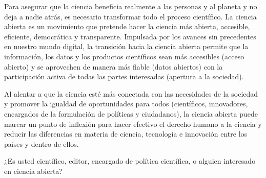 \documentclass[
  letterpaper,
  DIV=11,
  numbers=noendperiod]{scrartcl}
\theoremstyle{definition}
\theoremstyle{remark}
\begin{document}
\begin{tcolorbox}[enhanced jigsaw, left=2mm, title=\textcolor{quarto-callout-warning-color}{\faExclamationTriangle}\hspace{0.5em}{Advertencia}, colbacktitle=quarto-callout-warning-color!10!white, opacitybacktitle=0.6, opacityback=0, colframe=quarto-callout-warning-color-frame, colback=white, rightrule=.15mm, toprule=.15mm, bottomrule=.15mm, bottomtitle=1mm, coltitle=black, breakable, toptitle=1mm, titlerule=0mm, arc=.35mm, leftrule=.75mm]

Para asegurar que la ciencia beneficia realmente a las personas y al
planeta y no deja a nadie atrás, es necesario transformar todo el
proceso científico. La ciencia abierta es un movimiento que pretende
hacer la ciencia más abierta, accesible, eficiente, democrática y
transparente. Impulsada por los avances sin precedentes en nuestro mundo
digital, la transición hacia la ciencia abierta permite que la
información, los datos y los productos científicos sean más accesibles
(acceso abierto) y se aprovechen de manera más fiable (datos abiertos)
con la participación activa de todas las partes interesadas (apertura a
la sociedad).

\end{tcolorbox}

\begin{tcolorbox}[enhanced jigsaw, left=2mm, title=\textcolor{quarto-callout-important-color}{\faExclamation}\hspace{0.5em}{Importante}, colbacktitle=quarto-callout-important-color!10!white, opacitybacktitle=0.6, opacityback=0, colframe=quarto-callout-important-color-frame, colback=white, rightrule=.15mm, toprule=.15mm, bottomrule=.15mm, bottomtitle=1mm, coltitle=black, breakable, toptitle=1mm, titlerule=0mm, arc=.35mm, leftrule=.75mm]

Al alentar a que la ciencia esté más conectada con las necesidades de la
sociedad y promover la igualdad de oportunidades para todos
(científicos, innovadores, encargados de la formulación de políticas y
ciudadanos), la ciencia abierta puede marcar un punto de inflexión para
hacer efectivo el derecho humano a la ciencia y reducir las diferencias
en materia de ciencia, tecnología e innovación entre los países y dentro
de ellos.

\end{tcolorbox}

\begin{tcolorbox}[enhanced jigsaw, left=2mm, title=\textcolor{quarto-callout-tip-color}{\faLightbulb}\hspace{0.5em}{Tip}, colbacktitle=quarto-callout-tip-color!10!white, opacitybacktitle=0.6, opacityback=0, colframe=quarto-callout-tip-color-frame, colback=white, rightrule=.15mm, toprule=.15mm, bottomrule=.15mm, bottomtitle=1mm, coltitle=black, breakable, toptitle=1mm, titlerule=0mm, arc=.35mm, leftrule=.75mm]

¿Es usted científico, editor, encargado de política científica, o
alguien interesado en ciencia abierta?

\end{tcolorbox}
\end{document}
